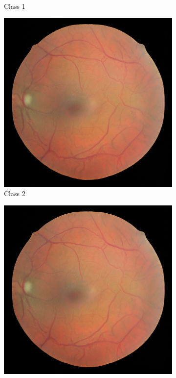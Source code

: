 \documentclass[sigconf,nonacm]{acmart}
\begin{document}
\begin{figure}[H]
\begin{subfigure}{0.18\linewidth}
\caption{Class 1}
\end{subfigure}
\begin{subfigure}{0.18\linewidth}
\centering
\includegraphics[width=0.9\linewidth]{fake-class0.png}
\caption{Class 2}
\end{subfigure}
\begin{subfigure}{0.18\linewidth}
\centering
\includegraphics[width=0.9\linewidth]{fake-class0.png}

\end{subfigure}
\end{figure}
\end{document}
